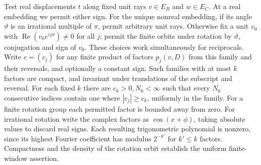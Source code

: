 \documentclass[11pt,a4paper]{article}
\begin{document}
Test real displacements $t$ along fixed unit rays $v\in E_B$ and
$w\in E_C$. At a real embedding we permit either sign. For the unique
nonreal embedding, if its angle $\vartheta$ is an irrational multiple
of $\pi$, permit arbitrary unit rays. Otherwise fix a unit $v_0$
with $\operatorname{Re}(v_0e^{ij\vartheta})\ne0$ for all $j$;
permit the finite orbits under rotation by $\vartheta$, conjugation
and sign of $v_0$. These choices work simultaneously for reciprocals.
Write $c=(c_j)$ for any finite product of factors $p_j(v,D)$ from
this family and their reversals, and optionally a constant sign.
Such families with at most $k$ factors are compact, and invariant under
translations of the subscript and reversal. For each fixed $k$ there
are $c_k>0,N_k<\infty$ such that every $N_k$ consecutive indices
contain one where $|c_j|\ge c_k$, uniformly in the family. For a
finite rotation group each permitted factor is bounded away from
zero. For irrational rotation write the complex factors as
$\cos(x+\phi)$, taking absolute values to discard real signs.
Each resulting trigonometric polynomial is nonzero, since its
highest Fourier coefficient has modulus $2^{-k'}$ for $k'\le k$
factors. Compactness and the density of the rotation orbit establish
the uniform finite-window assertion.
\end{document}
